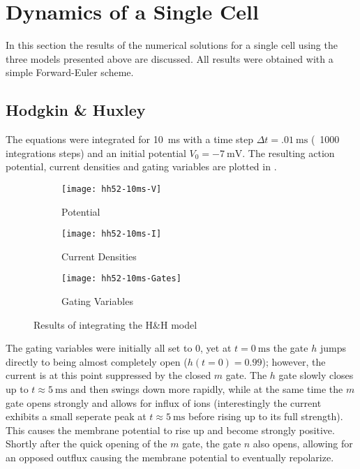 \section{Dynamics of a Single Cell}
In this section the results of the numerical solutions for a single cell
using the three models presented above are discussed. All results were
obtained with a simple Forward-Euler scheme.


\subsection{Hodgkin \& Huxley}
The equations were integrated for \SI{10}{\milli\second} with a time step
$\Delta{t}=\SI{.01}{\milli\second}$ (\ie~1000 integrations steps) and an
initial potential $V_0=\SI{-7}{\milli\volt}$. The resulting action potential,
current densities and gating variables are plotted in .

\begin{figure}[h]
    \centering
    \begin{subfigure}[h]{.3\textwidth}
        \texttt{[image: hh52-10ms-V]}
        \vspace{-\baselineskip}
        \label{fig:hh1V}
        \caption{Potential}
    \end{subfigure}
    \begin{subfigure}[h]{.3\textwidth}
        \texttt{[image: hh52-10ms-I]}
        \vspace{-\baselineskip}
        \label{fig:hh1I}
        \caption{Current Densities}
    \end{subfigure}
    \begin{subfigure}[h]{.3\textwidth}
        \texttt{[image: hh52-10ms-Gates]}
        \vspace{-\baselineskip}
        \label{fig:hh1Gates}
        \caption{Gating Variables}
    \end{subfigure}
    \label{fig:hh1}
    \caption{Results of integrating the H\&H model}
\end{figure}

The gating variables were initially all set to 0, yet at
$t=\SI{0}{\milli\second}$ the  gate $h$ jumps directly to being almost
completely open ($h(t=0)=0.99$); however, the  current is at this point
suppressed by the closed $m$ gate. The $h$ gate slowly closes up to
$t\approx\SI{5}{\milli\second}$ and then swings down more rapidly, while at the same
time the $m$ gate opens strongly and allows for influx of  ions
(interestingly the  current exhibits a small seperate peak at
$t\approx\SI{5}{\milli\second}$ before rising up to its full strength). This
causes the membrane potential to rise up and become strongly positive. Shortly
after the quick opening of the $m$ gate, the  gate $n$ also opens,
allowing for an opposed  outflux causing the membrane potential to
eventually repolarize.


